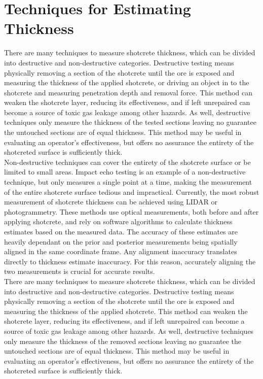\section{Techniques for Estimating Thickness}

There are many techniques to measure shotcrete thickness, which can be divided into destructive and non-destructive categories. Destructive testing means physically removing a section of the shotcrete until the ore is exposed and measuring the thickness of the applied shotcrete, or driving an object in to the shotcrete and measuring penetration depth and removal force. This method can weaken the shotcrete layer, reducing its effectiveness, and if left unrepaired can become a source of toxic gas leakage among other hazards. As well, destructive techniques only measure the thickness of the tested sections leaving no guarantee the untouched sections are of equal thickness. This method may be useful in evaluating an operator's effectiveness, but offers no assurance the entirety of the shotcreted surface is sufficiently thick.\\

Non-destructive techniques can cover the entirety of the shotcrete surface or be limited to small areas. Impact echo testing is an example of a non-destructive technique\cite{impact}, but only measures a single point at a time, making the measurement of the entire shotcrete surface tedious and impractical. Currently, the most robust measurement of shotcrete thickness can be achieved using LIDAR or photogrammetry. These methods use optical measurements, both before and after applying shotcrete, and rely on software algorithms to calculate thickness estimates based on the measured data. The accuracy of these estimates are heavily dependant on the prior and posterior measurements being spatially aligned in the same coordinate frame. Any alignment inaccuracy translates directly to thickness estimate inaccuracy. For this reason, accurately aligning the two measurements is crucial for accurate results.\\

There are many techniques to measure shotcrete thickness, which can be divided into destructive and non-destructive categories. Destructive testing means physically removing a section of the shotcrete until the ore is exposed and measuring the thickness of the applied shotcrete. This method can weaken the shotcrete layer, reducing its effectiveness, and if left unrepaired can become a source of toxic gas leakage among other hazards. As well, destructive techniques only measure the thickness of the removed sections leaving no guarantee the untouched sections are of equal thickness. This method may be useful in evaluating an operator's effectiveness, but offers no assurance the entirety of the shotcreted surface is sufficiently thick.\\

